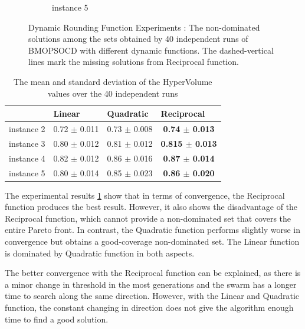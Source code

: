 \documentclass[10pt,journal,compsoc]{IEEEtran}
\begin{document}
\begin{figure}[h!]
\begin{subfigure}{0.49\linewidth}
    \caption{instance 5}
   \end{subfigure}
   \caption{Dynamic Rounding Function Experiments : The non-dominated solutions among the sets obtained by 40 independent runs of BMOPSOCD with different dynamic functions. The dashed-vertical lines mark the missing solutions from Reciprocal function.}
   \label{fig:dynamicFunctions}
\end{figure}


\begin{table}[H]
\centering
\footnotesize
\caption{The mean and standard deviation of the HyperVolume values over the 40 independent runs}
\label{tab:hyperDynamic}
\begin{tabular}{l|c|c|c}
\hline
          & \multicolumn{1}{l|}{Linear} & \multicolumn{1}{l|}{Quadratic} & \multicolumn{1}{l}{Reciprocal}  \\ \hline
instance 2 & 0.72 $\pm$ 0.011            & 0.73 $\pm$ 0.008               & \textbf{0.74 $\pm$ 0.013}    \\
instance 3 & 0.80 $\pm$ 0.012            & 0.81 $\pm$ 0.012               & \textbf{0.815 $\pm$ 0.013}    \\
instance 4 & 0.82 $\pm$ 0.012            & 0.86 $\pm$ 0.016               & \textbf{0.87 $\pm$ 0.014}   \\
instance 5 & 0.80 $\pm$ 0.014            & 0.85 $\pm$ 0.023               & \textbf{0.86 $\pm$ 0.020}   \\ \hline
\end{tabular}
\end{table}

The experimental results \ref{tab:hyperDynamic} show that in terms of convergence, the Reciprocal function produces the best result. 
However, it also shows the disadvantage of the Reciprocal function, which cannot provide a non-dominated set that covers the entire Pareto front. 
In contrast, the Quadratic function performs
slightly worse in convergence but obtains a good-coverage non-dominated set. The Linear function is dominated by Quadratic function in both aspects.

The better convergence with the Reciprocal function can be explained, as there is a minor change in threshold in the most generations and the swarm has a longer time to search along the same direction. However, with the Linear and Quadratic function, the constant changing in direction does not give the algorithm enough time to find a good solution.
\end{document}
